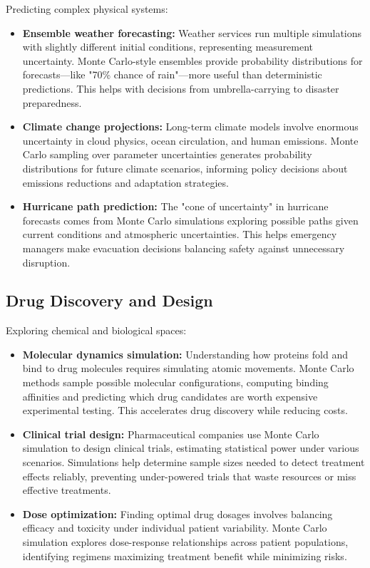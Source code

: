 Predicting complex physical systems:

\begin{itemize}
    \item \textbf{Ensemble weather forecasting:} Weather services run multiple simulations with slightly different initial conditions, representing measurement uncertainty. Monte Carlo-style ensembles provide probability distributions for forecasts—like "70\% chance of rain"—more useful than deterministic predictions. This helps with decisions from umbrella-carrying to disaster preparedness.
    
    \item \textbf{Climate change projections:} Long-term climate models involve enormous uncertainty in cloud physics, ocean circulation, and human emissions. Monte Carlo sampling over parameter uncertainties generates probability distributions for future climate scenarios, informing policy decisions about emissions reductions and adaptation strategies.
    
    \item \textbf{Hurricane path prediction:} The "cone of uncertainty" in hurricane forecasts comes from Monte Carlo simulations exploring possible paths given current conditions and atmospheric uncertainties. This helps emergency managers make evacuation decisions balancing safety against unnecessary disruption.
\end{itemize}

\subsection{Drug Discovery and Design}

Exploring chemical and biological spaces:

\begin{itemize}
    \item \textbf{Molecular dynamics simulation:} Understanding how proteins fold and bind to drug molecules requires simulating atomic movements. Monte Carlo methods sample possible molecular configurations, computing binding affinities and predicting which drug candidates are worth expensive experimental testing. This accelerates drug discovery while reducing costs.
    
    \item \textbf{Clinical trial design:} Pharmaceutical companies use Monte Carlo simulation to design clinical trials, estimating statistical power under various scenarios. Simulations help determine sample sizes needed to detect treatment effects reliably, preventing under-powered trials that waste resources or miss effective treatments.
    
    \item \textbf{Dose optimization:} Finding optimal drug dosages involves balancing efficacy and toxicity under individual patient variability. Monte Carlo simulation explores dose-response relationships across patient populations, identifying regimens maximizing treatment benefit while minimizing risks.
\end{itemize}

